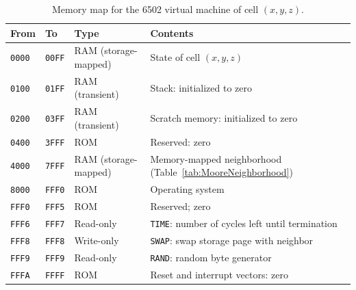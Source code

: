 \documentclass{article}
\newcommand\code[1]{{\tt #1}}
\newcommand\hex[1]{{\tt #1}}
\begin{document}
\newcommand\memyz[2]{
  \memz{{#1}0}{{#1}1}{{#1}2}{#2}{-1}
  \memz{{#1}4}{{#1}5}{{#1}6}{#2}{}
  \memz{{#1}8}{{#1}9}{{#1}A}{#2}{+1}
}

\newcommand\memxyz{
  \memyz{4}{-1}

  \memz{50}{51}{52}{}{-1}
  \memrow{54}{}{}{-1}
  \memrow{56}{}{}{+1}
  \memz{58}{59}{5A}{}{+1}

  \memyz{6}{+1}
}

\newcommand\vonneumannmap{\memtable{
  \memrow{45}{-1}{}{}
  \memrow{51}{}{-1}{}
  \memrow{54}{}{}{-1}
  \memrow{56}{}{}{+1}
  \memrow{59}{}{+1}{}
  \memrow{65}{+1}{}{}
}}

\newcommand\mooremap{\memtable{\memxyz}}

\begin{table}
\begin{tabular}{llll}
  \hline
  From & To & Type & Contents \\
  \hline
  \hex{0000} & \hex{00FF} & RAM (storage-mapped) & State of cell $(x,y,z)$ \\
  \hex{0100} & \hex{01FF} & RAM (transient) & Stack: initialized to zero \\
  \hex{0200} & \hex{03FF} & RAM (transient) & Scratch memory: initialized to zero \\
  \hex{0400} & \hex{3FFF} & ROM & Reserved: zero \\
  \hex{4000} & \hex{7FFF} & RAM (storage-mapped) & Memory-mapped neighborhood (Table~\ref{tab:MooreNeighborhood}) \\
  \hex{8000} & \hex{FFF0} & ROM & Operating system \\
  \hex{FFF0} & \hex{FFF5} & ROM & Reserved; zero \\
  \hex{FFF6} & \hex{FFF7} & Read-only & \code{TIME}: number of cycles left until termination \\
  \hex{FFF8} & \hex{FFF8} & Write-only & \code{SWAP}: swap storage page with neighbor \\
  \hex{FFF9} & \hex{FFF9} & Read-only & \code{RAND}: random byte generator \\
  \hex{FFFA} & \hex{FFFF} & ROM & Reset and interrupt vectors: zero \\
  \hline
\end{tabular}
\caption{
  \label{tab:MemoryMap}
  Memory map for the 6502 virtual machine of cell $(x,y,z)$.
}
\end{table}
\end{document}
